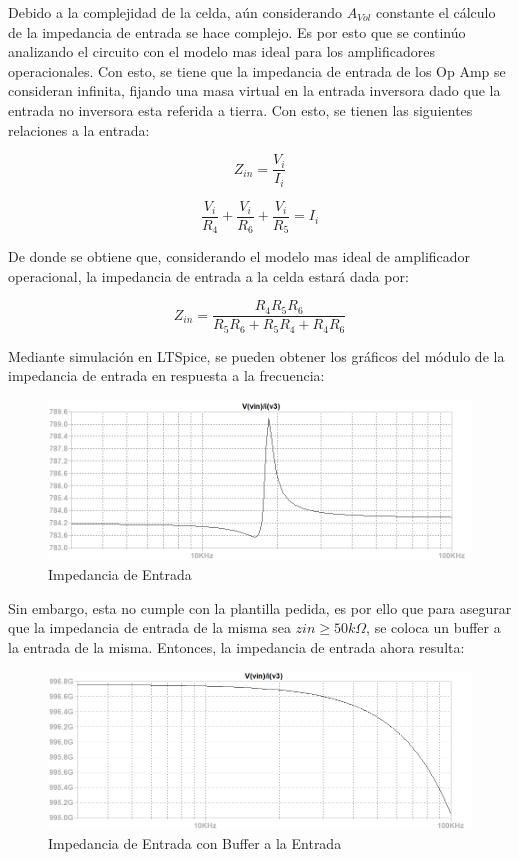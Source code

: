 Debido a la complejidad de la celda, aún considerando $A_{Vol}$ constante el cálculo de la impedancia de entrada se hace complejo. Es por esto que se continúo analizando el circuito con el modelo mas ideal para los amplificadores operacionales. Con esto, se tiene que la impedancia de entrada de los Op Amp se consideran infinita, fijando una masa virtual en la entrada inversora dado que la entrada no inversora esta referida a tierra. Con esto, se tienen las siguientes relaciones a la entrada:

$$Z_{in} = \frac{V_{i}}{I_{i}}$$

$$\frac{V_{i}}{R_{4}} + \frac{V_{i}}{R_{6}} + \frac{V_{i}}{R_{5}} = I_{i}$$

De donde se obtiene que, considerando el modelo mas ideal de amplificador operacional, la impedancia de entrada a la celda estará dada por:

$$Z_{in} = \frac{R_{4}R_{5}R_{6}}{R_{5}R_{6}+R_{5}R_{4}+R_{4}R_{6}}$$

Mediante simulación en LTSpice, se pueden obtener los gráficos del módulo de la impedancia de entrada en respuesta a la frecuencia:

\begin{figure}[H]
    \centering
    \includegraphics[scale = 0.7]{../Ejercicio2-DisenoDeCeldas/4CeldaUniversal/Informe/zin1.PNG}
    \caption{Impedancia de Entrada}
    \label{ej4zin1}
\end{figure}

Sin embargo, esta no cumple con la plantilla pedida, es por ello que para asegurar que la impedancia de entrada de la misma sea $zin \geq 50k\Omega$, se coloca un buffer a la entrada de la misma. Entonces, la impedancia de entrada ahora resulta:

\begin{figure}[H]
    \centering
    \includegraphics[scale = 0.7]{../Ejercicio2-DisenoDeCeldas/4CeldaUniversal/Informe/zin2.PNG}
    \caption{Impedancia de Entrada con Buffer a la Entrada}
    \label{ej4zin2}
\end{figure}


